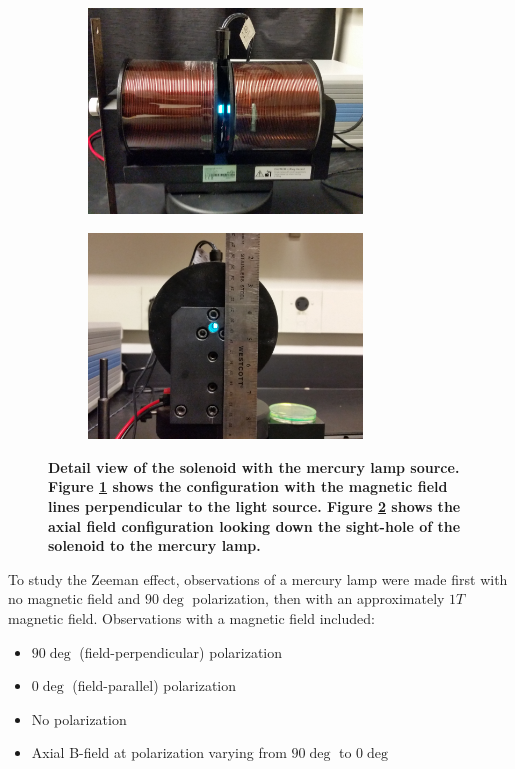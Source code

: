 \documentclass[twocolumn]{article}
\begin{document}
	\begin{figure}
		\centering
		\begin{subfigure}{0.5\textwidth}
			\includegraphics[width = 0.8\textwidth]{Images/PerpendicularView.jpg}
			\caption{}
			\label{subfig:PerpView}
		\end{subfigure}%
		\begin{subfigure}{0.5\textwidth}
			\includegraphics[width = 0.8\textwidth]{Images/AxialView.jpg}
			\caption{}
			\label{subfig:AxialView}
		\end{subfigure}%
		\caption{\textbf{Detail view of the solenoid with the mercury lamp source. Figure \ref{subfig:PerpView} shows the configuration with the magnetic field lines perpendicular to the light source. Figure \ref{subfig:AxialView} shows the axial field configuration looking down the sight-hole of the solenoid to the mercury lamp.}}
		\label{fig:SolenoidDetail}
	\end{figure}
	
	
	
	To study the Zeeman effect, observations of a mercury lamp were made first with no magnetic field and $90\deg$ polarization, then with an approximately $1T$ magnetic field.
	Observations with a magnetic field included:
	\begin{itemize}
		\item $90\deg$ (field-perpendicular) polarization
		\item $0\deg$ (field-parallel) polarization 
		\item No polarization
		\item Axial B-field at polarization varying from $90\deg$ to $0\deg$
	\end{itemize}
	
\end{document}
